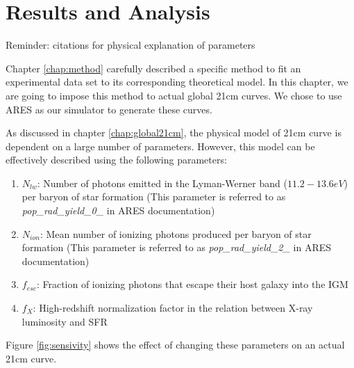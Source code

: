 \documentclass[12pt, TexShade, letterpaper]{report}
\begin{document}
\chapter{Results and Analysis}
\label{chap:results}
Reminder: citations for physical explanation of parameters\par
Chapter \ref{chap:method} carefully described a specific method to fit an experimental data set to its corresponding theoretical model. In this chapter, we are going to impose this method to actual global 21cm curves. We chose to use ARES as our simulator to generate these curves. \par
As discussed in chapter \ref{chap:global21cm}, the physical model of 21cm curve is dependent on a large number of parameters. However, this model can be effectively described using the following parameters:
\begin{enumerate}
    \item \textbf{$N_{lw}$}: Number of photons emitted in the Lyman-Werner band ($11.2-13.6eV$) per baryon of star formation (This parameter is referred to as \emph{pop\_rad\_yield\_0\_} in ARES documentation)
    \item \textbf{$N_{ion}$}: Mean number of ionizing photons produced per baryon of star formation (This parameter is referred to as \emph{pop\_rad\_yield\_2\_} in ARES documentation)
    \item \textbf{$f_{esc}$}: Fraction of ionizing photons that escape their host galaxy into the IGM
    \item \textbf{$f_X$}: High-redshift normalization factor in the relation between X-ray luminosity and SFR
\end{enumerate}
Figure \ref{fig:sensivity} shows the effect of changing these parameters on an actual 21cm curve.\par
\end{document}
